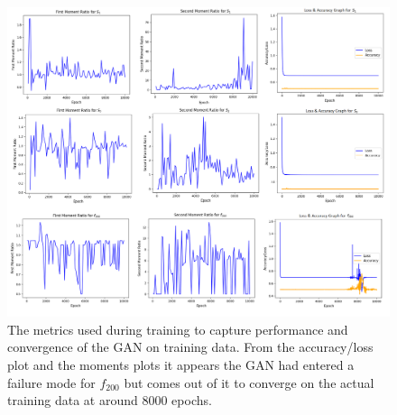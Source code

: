 \documentclass[11pt]{article} %
\begin{document}
\newpage
\null
\vfill
\begin{figure}[H]
\includegraphics[scale=0.47]{./images/working_metrics.png}
\caption{The metrics used during training to capture performance and convergence
of the GAN on training data.
 From the accuracy/loss plot and the moments plots it appears the GAN had entered a failure mode for $f_{200}$ but
 comes out of it to converge on the actual training data at around 8000 epochs.}
\label{fig:ind_results_metrics}
\end{figure}
\null
\vfill
\newpage
\end{document}
